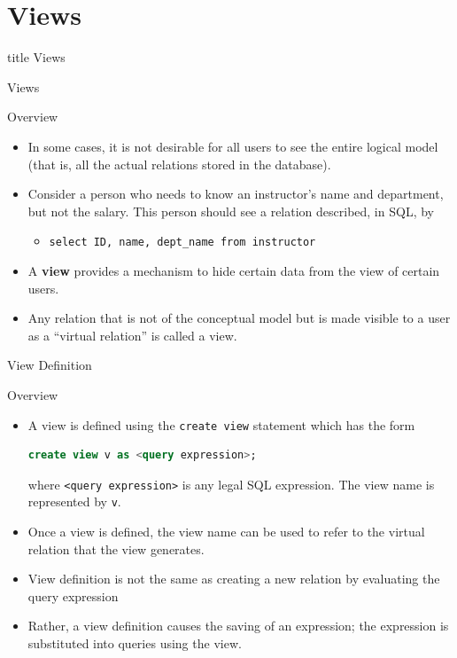 \documentclass[aspectratio=169, xcolor=dvipsnames]{beamer}
\begin{document}
\section{Views}
\begin{frame}
  \vfill
  \centering
  \begin{beamercolorbox}[sep=8pt,center,shadow=true,rounded=true]{title}
    Views\par%
  \end{beamercolorbox}
  \vfill
\end{frame}

\begin{frame}{Views}
    \begin{block}{Overview}
        \begin{itemize}[<+->]
            \item In some cases, it is not desirable for all users to see the entire logical model (that is, all the actual relations stored in the database).
            \item Consider a person who needs to know an instructor's name and department, but not the salary. This person should see a relation described, in SQL, by
            \begin{itemize}
                \item[$\triangleright$] \texttt{select ID, name, dept\_name from instructor}
            \end{itemize}
            \item A \textbf{view} provides a mechanism to hide certain data from the view of certain users.
            \item Any relation that is not of the conceptual model but is made visible to a user as a ``virtual relation'' is called a view.
        \end{itemize}
    \end{block}
\end{frame}

\begin{frame}[fragile]{View Definition}
    \begin{block}{Overview}
        \begin{itemize}[<+->]
            \item A view is defined using the \texttt{create view} statement which has the form
            \begin{lstlisting}[language=SQL]
create view v as <query expression>;
            \end{lstlisting}
            where \texttt{<query expression>} is any legal SQL expression. The view name is represented by \texttt{v}.
            \item Once a view is defined, the view name can be used to refer to the virtual relation that the view generates.
            \item View definition is not the same as creating a new relation by evaluating the query expression
            \item Rather, a view definition causes the saving of an expression; the expression is substituted into queries using the view.
        \end{itemize}
    \end{block}
\end{frame}
\end{document}

